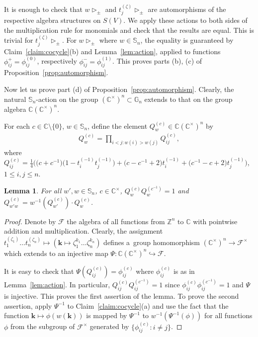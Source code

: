 \documentclass[11pt]{article}
\newcommand{\g}[1]{t_{#1}^{(-1)}}
\newtheorem{Lemma}[Theorem]{Lemma}
\begin{document}
It is enough to check that $w\mathop{\triangleright}\nolimits_\pm$ and
$t_j^{(\zeta)}\mathop{\triangleright}\nolimits_\pm$ are automorphisms of the respective algebra structures on $S(V)$.
We apply these actions to both sides of the multiplication rule for monomials and check that the results are equal.
This is trivial for $t_j^{(\zeta)}\mathop{\triangleright}\nolimits_\pm$.
For $w\mathop{\triangleright}\nolimits_\pm$ where $w\in \mathbb S_n$,   the equality is guaranteed by
Claim~\ref{claim:cocycle}(b) and Lemma~\ref{lem:action}, applied to functions $\phi_{ij}^+=\phi_{ij}^{(0)}$,
respectively $\phi_{ij}^-=\phi_{ij}^{(1)}$.
This proves parts (b), (c) of Proposition~\ref{prop:automorphism}.

Now let us prove part (d) of Proposition~\ref{prop:automorphism}.
Clearly, the natural $\mathbb S_n$-action on the group $(\mathbb C^\times)^ n\subset \mathbb G_n$ extends to that on the
group algebra $\mathbb C (\mathbb C^\times)^n$.

For each $c\in \mathbb C\setminus\{0\}$, $w\in \mathbb S_n$, def\/ine the element $Q_w^{(c)}\in \mathbb C (\mathbb C^\times)^n$ by
\begin{gather*}
Q_w^{(c)} = \prod\limits_{i<j:w(i)>w(j)} Q_{ij}^{(c)},
\end{gather*}
where $ Q_{ij}^{(c)} = \frac14 \big(\big(c+c^{-1}\big)\big(1-\g i\g j\big)+ \big(c-c^{-1}+2\big)\g i+\big(c^{-1}-c+2\big)\g j\big)$, $1\le i,j\le n$.
\begin{Lemma}\label{lem:Q}
For all $w',w\in \mathbb S_n$, $c\in\mathbb C^\times$, $Q_w^{(c)}Q_w^{(c^{-1})}=1$ and
$Q_{w'w}^{(c)}=w^{-1}(Q_{w'}^{(c)})\cdot Q_w^{(c)}$.
\end{Lemma}
\begin{proof}
Denote by $\mathcal F$ the algebra of all functions from $\mathbb Z^n$ to $\mathbb C$ with pointwise addition and
multiplication.
Clearly, the assignment $t_1^{(\zeta_1)}\ldots t_n^{(\zeta_n)} \mapsto (\mathbf k\mapsto \zeta_1^{k_1}\ldots
\zeta_n^{k_n})$ def\/ines a~group homomorphism $(\mathbb C^\times)^n\to \mathcal F^\times $ which extends to an injective
map $\Psi\colon \mathbb C(\mathbb C^\times)^n\hookrightarrow \mathcal F$.

It is easy to check that $\Psi(Q_{ij}^{(c)})=\phi_{ij}^{(c)}$ where $\phi_{ij}^{(c)}$ is as in Lemma~\ref{lem:action}.
In particular, $Q_{ij}^{(c)}Q_{ij}^{(c^{-1})}=1$ since $\phi_{ij}^{(c)}\phi_{ij}^{(c^{-1})}=1$ and $\Psi$ is injective.
This proves the f\/irst assertion of the lemma.
To prove the second assertion, apply $\Psi^{-1}$ to Claim~\ref{claim:cocycle}(a) and use the fact that the function
$\mathbf k\mapsto \phi(w(\mathbf k))$ is mapped by $\Psi^{-1}$ to $w^{-1}(\Psi^{-1}(\phi))$ for all functions $\phi$
from the subgroup of $\mathcal F^\times$ generated by $\{\phi_{ij}^{(c)}:i\ne j\}$.
\end{proof}
\end{document}
